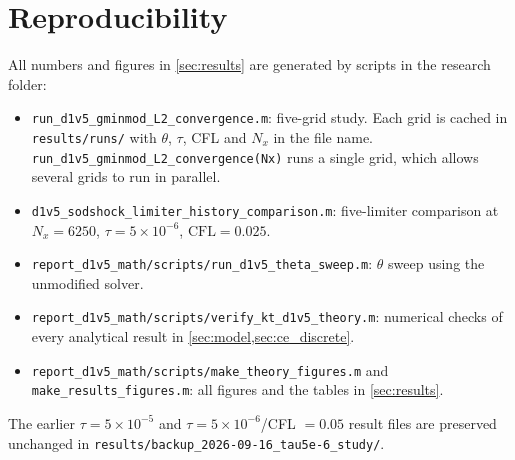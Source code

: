 \documentclass[11pt]{article}
\newcommand{\file}[1]{\nolinkurl{#1}}
\theoremstyle{remark}
\begin{document}
\section{Reproducibility}
\label{app:repro}
All numbers and figures in \cref{sec:results} are generated by scripts in the
research folder:
\begin{itemize}
  \item \file{run_d1v5_gminmod_L2_convergence.m}: five-grid study.  Each grid
        is cached in \texttt{results/runs/} with $\theta$, $\tau$, CFL and $N_x$ in the
        file name.  \file{run_d1v5_gminmod_L2_convergence(Nx)} runs a single
        grid, which allows several grids to run in parallel.
  \item \file{d1v5_sodshock_limiter_history_comparison.m}: five-limiter
        comparison at $N_x=6250$, $\tau=5\times10^{-6}$, $\mathrm{CFL}=0.025$.
  \item \file{report_d1v5_math/scripts/run_d1v5_theta_sweep.m}: $\theta$ sweep
        using the unmodified solver.
  \item \file{report_d1v5_math/scripts/verify_kt_d1v5_theory.m}: numerical
        checks of every analytical result in \cref{sec:model,sec:ce_discrete}.
  \item \file{report_d1v5_math/scripts/make_theory_figures.m} and
        \file{make_results_figures.m}: all figures and the tables
        in \cref{sec:results}.
\end{itemize}
The earlier $\tau=5\times10^{-5}$ and $\tau=5\times10^{-6}$/CFL $=0.05$ result files are
preserved unchanged in \file{results/backup_2026-09-16_tau5e-6_study/}.
\end{document}
